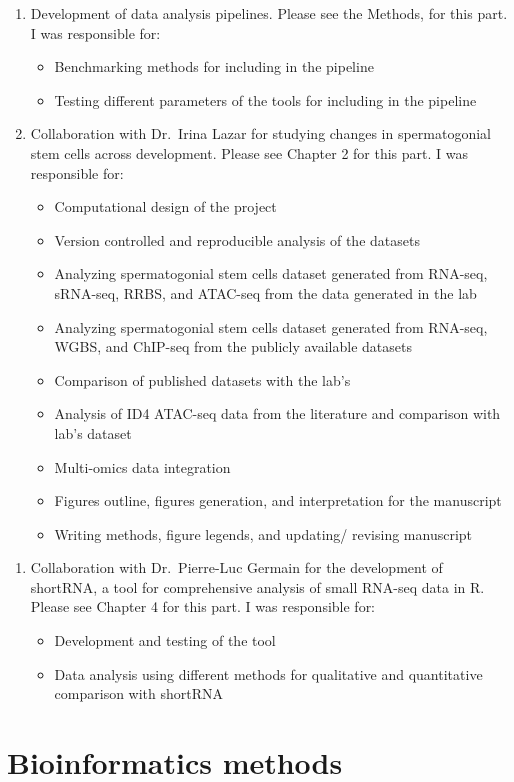 \documentclass[12pt,twoside]{reedthesis}
\begin{document}
\begin{enumerate}
\def\labelenumi{\arabic{enumi}.}
\setcounter{enumi}{1}
\item
  Development of data analysis pipelines. Please see the Methods, for
  this part. I was responsible for:
  \begin{itemize}
  \item
    Benchmarking methods for including in the pipeline
  \item
    Testing different parameters of the tools for including in the
    pipeline
  \end{itemize}
\item
  Collaboration with Dr.~Irina Lazar for studying changes in
  spermatogonial stem cells across development. Please see Chapter 2
  for this part. I was responsible for:
  \begin{itemize}
  \item
    Computational design of the project
  \item
    Version controlled and reproducible analysis of the datasets
  \item
    Analyzing spermatogonial stem cells dataset generated from
    RNA-seq, sRNA-seq, RRBS, and ATAC-seq from the data generated in
    the lab
  \item
    Analyzing spermatogonial stem cells dataset generated from
    RNA-seq, WGBS, and ChIP-seq from the publicly available datasets
  \item
    Comparison of published datasets with the lab's
  \item
    Analysis of ID4 ATAC-seq data from the literature and comparison
    with lab's dataset
  \item
    Multi-omics data integration
  \item
    Figures outline, figures generation, and interpretation for the
    manuscript
  \item
    Writing methods, figure legends, and updating/ revising
    manuscript
  \end{itemize}
\end{enumerate}
\begin{enumerate}
\def\labelenumi{\arabic{enumi}.}
\setcounter{enumi}{3}
\item
  Collaboration with Dr.~Pierre-Luc Germain for the development of
  shortRNA, a tool for comprehensive analysis of small RNA-seq data
  in R. Please see Chapter 4 for this part. I was responsible for:
  \begin{itemize}
  \item
    Development and testing of the tool
  \item
    Data analysis using different methods for qualitative and
    quantitative comparison with shortRNA
  \end{itemize}
\end{enumerate}
\hypertarget{methods}{%
\chapter*{Bioinformatics methods}\label{methods}}
\end{document}
